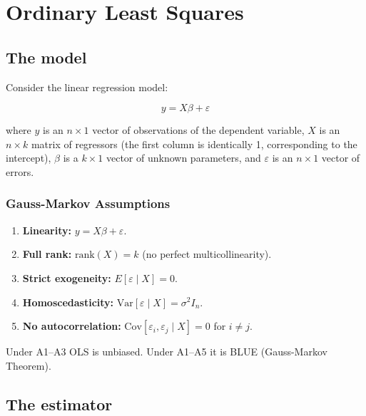 \chapter{Ordinary Least Squares}
\label{cap:ols}

\section{The model}

Consider the linear regression model:

\[
  y = X\beta + \varepsilon
\]

where $y$ is an $n \times 1$ vector of observations of the dependent variable,
$X$ is an $n \times k$ matrix of regressors (the first column is
identically 1, corresponding to the intercept), $\beta$ is a
$k \times 1$ vector of unknown parameters, and $\varepsilon$ is an
$n \times 1$ vector of errors.

\subsection*{Gauss-Markov Assumptions}

\begin{enumerate}
  \item \textbf{Linearity:} $y = X\beta + \varepsilon$.
  \item \textbf{Full rank:} $\mathrm{rank}(X) = k$ (no perfect multicollinearity).
  \item \textbf{Strict exogeneity:} $E[\varepsilon \mid X] = 0$.
  \item \textbf{Homoscedasticity:} $\mathrm{Var}[\varepsilon \mid X] = \sigma^2 I_n$.
  \item \textbf{No autocorrelation:} $\mathrm{Cov}[\varepsilon_i, \varepsilon_j \mid X] = 0$ for $i \neq j$.
\end{enumerate}

Under A1--A3 OLS is unbiased. Under A1--A5 it is BLUE (Gauss-Markov Theorem).

\section{The estimator}

